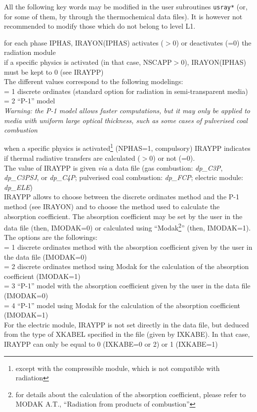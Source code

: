 All the following key words may be modified in the user subroutines
\texttt{usray*} (or, for some of them, by through the thermochemical data files).
It is however not recommended to modify those which do not belong to
level L1.

{for each phase IPHAS, IRAYON(IPHAS) activates ($>0$) or deactivates
(=0) the radiation module\\
if a specific physics is activated (in that case, NSCAPP$>$0),
IRAYON(IPHAS) must be kept to 0 (see IRAYPP)\\
The different values correspond to the following modelings:\\
\hspace*{1.3cm} = 1 discrete ordinates
(standard option for radiation in semi-transparent media)\\
\hspace*{1.3cm} = 2  ``P-1'' model\\
{\em Warning: the P-1 model allows faster computations, but it
may only be applied to media with uniform large optical thickness, such as
some cases of pulverised coal combustion}}

{when a specific physics is activated\footnote{except with the compressible
module, which is not compatible with radiation}
(NPHAS=1, compulsory) IRAYPP
indicates if thermal radiative transfers are calculated ($>0$) or not
(=0).\\
The value of IRAYPP is given {\em via} a data file (gas combustion:
{\em dp\_C3P}, {\em dp\_C3PSJ}, or {\em dp\_C4P};
pulverised coal combustion: {\em dp\_FCP}; electric module: {\em dp\_ELE})\\
IRAYPP allows to choose between the discrete ordinates method and the
P-1 method (see IRAYON) and to choose the method used to calculate the
absorption coefficient. The absorption coefficient may be set by the
user in the data file (then, \mbox{IMODAK=0}) or calculated using
``Modak\footnote{for details about the calculation of the absorption
coefficient, please refer to MODAK A.T., ``Radiation from products
of combustion''}'' (then, IMODAK=1).
The options are the followings:\\
\hspace*{1.3cm} = 1 discrete ordinates method with the absorption coefficient
given by the user in the data file (IMODAK=0)\\
\hspace*{1.3cm} = 2 discrete ordinates method using Modak for the
calculation of the absorption coefficient (IMODAK=1)\\
\hspace*{1.3cm} = 3 ``P-1'' model  with the absorption coefficient
given by the user in the data file (IMODAK=0)\\
\hspace*{1.3cm} = 4 ``P-1'' model using Modak for the
calculation of the absorption coefficient (IMODAK=1)\\
For the electric module, IRAYPP is not set directly in the data file, but
deduced from the type of XKABEL specified in the file (given by IXKABE).
In that case, IRAYPP can only be equal to 0 (IXKABE=0 or 2) or 1 (IXKABE=1)}

